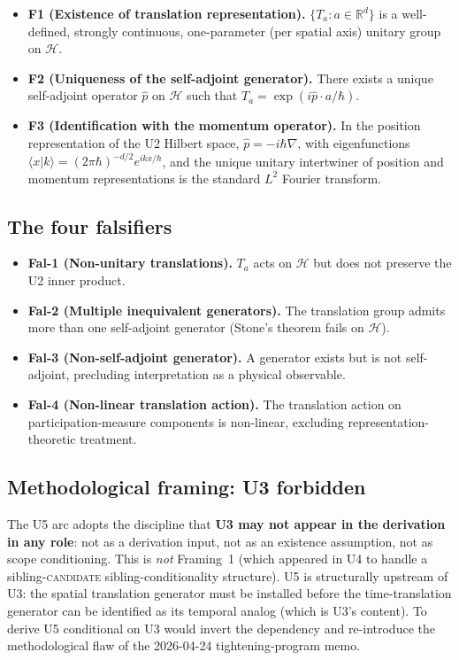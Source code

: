 \documentclass[11pt,a4paper]{article}
\begin{document}
\begin{itemize}
  \item \textbf{F1 (Existence of translation representation).} $\{T_a : a \in \mathbb{R}^d\}$ is a well-defined, strongly continuous, one-parameter (per spatial axis) unitary group on $\mathcal{H}$.
  \item \textbf{F2 (Uniqueness of the self-adjoint generator).} There exists a unique self-adjoint operator $\hat{p}$ on $\mathcal{H}$ such that $T_a = \exp(i\hat{p} \cdot a / \hbar)$.
  \item \textbf{F3 (Identification with the momentum operator).} In the position representation of the U2 Hilbert space, $\hat{p} = -i\hbar\nabla$, with eigenfunctions $\langle x | k \rangle = (2\pi\hbar)^{-d/2} e^{ikx/\hbar}$, and the unique unitary intertwiner of position and momentum representations is the standard $L^2$ Fourier transform.
\end{itemize}

\subsection{The four falsifiers}

\begin{itemize}
  \item \textbf{Fal-1 (Non-unitary translations).} $T_a$ acts on $\mathcal{H}$ but does not preserve the U2 inner product.
  \item \textbf{Fal-2 (Multiple inequivalent generators).} The translation group admits more than one self-adjoint generator (Stone's theorem fails on $\mathcal{H}$).
  \item \textbf{Fal-3 (Non-self-adjoint generator).} A generator exists but is not self-adjoint, precluding interpretation as a physical observable.
  \item \textbf{Fal-4 (Non-linear translation action).} The translation action on participation-measure components is non-linear, excluding representation-theoretic treatment.
\end{itemize}

\subsection{Methodological framing: U3 forbidden}

The U5 arc adopts the discipline that \textbf{U3 may not appear in the derivation in any role}: not as a derivation input, not as an existence assumption, not as scope conditioning. This is \emph{not} Framing~1 (which appeared in U4 to handle a sibling-\textsc{candidate} sibling-conditionality structure). U5 is structurally upstream of U3: the spatial translation generator must be installed before the time-translation generator can be identified as its temporal analog (which is U3's content). To derive U5 conditional on U3 would invert the dependency and re-introduce the methodological flaw of the 2026-04-24 tightening-program memo.
\end{document}
